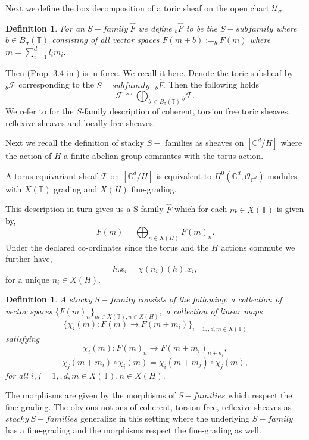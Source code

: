 \documentclass[10pt]{amsart}
\newtheorem{defn}[prop]{Definition}
\newcommand{\sO}{{\mathcal O}}
\newcommand{\sX}{{\mathcal X}}
\numberwithin{equation}{subsection}
\begin{document}
Next we define the box decomposition of a toric sheaf on the open chart $\mathscr{U}_{\sigma}.$
\begin{defn}
For an $S-family\ \hat{F}$ we define $_{b}\hat{F}$ to be the $S-subfamily$ where $b\in B_{\sigma}(\mathbb{T})$ consisting of all vector spaces $F(m+b):=_{b}F(m)$ where $m=\sum_{i=1}^{d}l_{i}m_{i}.$
\end{defn}
Then (Prop. 3.4 in \cite{GJK}) is in force. We recall it here. Denote the toric subsheaf by $_{b}\mathscr{F}$ corresponding to the $S-subfamily,\ _{b}\hat{F}.$ Then the following holds $$\mathscr{F}\cong{\bigoplus _{b\ \in B_{\sigma}(\mathbb{T})}}{_{b}\mathscr{F}}.$$
We refer to \cite{GJK} for the $S$-family description of coherent, torsion free toric sheaves, reflexive sheaves and locally-free sheaves.\par
Next we recall the definition of stacky $S-$ families as sheaves on $[\mathbb{C}^d/H]$ where the action of $H$ a finite abelian group commutes with the torus action.\par
A torus equivariant sheaf $\mathscr{F}$ on $[\mathbb{C}^d/H]$ is equivalent to $H^0(\mathbb{C}^d,\mathscr{O}_{\mathbb{C}^d})$ modules with $X(\mathbb{T})$ grading and $X(H)$ fine-grading.\par 
This description in turn gives us a S-family $\hat{F}$ which for each $m\in X(\mathbb{T})$ is given by,
$$F(m)=\bigoplus_{n\in X(H)}F(m)_{n}.$$ Under the declared co-ordinates since the torus and the $H$ actions commute we further have,
$$h.x_i=\chi(n_i)(h).x_i,$$ for a unique $n_i\in X(H).$
\begin{defn}
A  $stacky\ S-family$ consists of the following: a collection of vector spaces $\{F(m)_n\}_{m\in X(\mathbb{T}),n\in X(H)},$ a collection of linear maps $$\{\chi_{i}(m):F(m)\to F(m+m_i)\}_{i=1,,d,m\in X(\mathbb{T})}$$  satisfying
$$\chi_{i}(m):F(m)_n\to F(m+m_i)_{n+n_i},$$
$$\chi_{j}(m+m_i)\circ\chi_i(m)=\chi_{i}(m+m_j)\circ \chi_{j}(m),$$ for all $i,j=1,,d,m\in X(\mathbb{T}),n\in X(H).$
\end{defn}
The morphisms are given by the morphisms of $S-families $ which respect the fine-grading. The obvious notions of coherent, torsion free, reflexive sheaves as $stacky\ S-families$ generalize in this setting where the underlying $S-family$ has a fine-grading and the morphisms respect the fine-grading as well.


\end{document}
